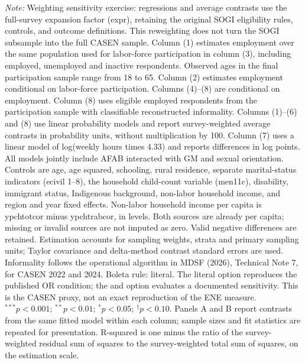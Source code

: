 \begin{table}[htpb!]
\begin{minipage}{\textwidth}
\textit{Note:} Weighting sensitivity exercise: regressions and average contrasts use the full-survey expansion factor (expr), retaining the original SOGI eligibility rules, controls, and outcome definitions. This reweighting does not turn the SOGI subsample into the full CASEN sample. Column (1) estimates employment over the same population used for labor-force participation in column (3), including employed, unemployed and inactive respondents. Observed ages in the final participation sample range from 18 to 65. Column (2) estimates employment conditional on labor-force participation. Columns (4)--(8) are conditional on employment.  Column (8) uses eligible employed respondents from the participation sample with classifiable reconstructed informality. Columns (1)--(6) and (8) use linear probability models and report survey-weighted average contrasts in probability units, without multiplication by 100. Column (7) uses a linear model of log(weekly hours times 4.33) and reports differences in log points. All models jointly include AFAB interacted with GM and sexual orientation. Controls are age, age squared, schooling, rural residence, separate marital-status indicators (ecivil 1--8), the household child-count variable (men11c), disability, immigrant status, Indigenous background, non-labor household income, and region and year fixed effects. Non-labor household income per capita is ypchtotcor minus ypchtrabcor, in levels. Both sources are already per capita; missing or invalid sources are not imputed as zero. Valid negative differences are retained. Estimation accounts for sampling weights, strata and primary sampling units; Taylor covariance and delta-method contrast standard errors are used. Informality follows the operational algorithm in MDSF (2026), Technical Note 7, for CASEN 2022 and 2024. Boleta rule: literal. The literal option reproduces the published OR condition; the and option evaluates a documented sensitivity. This is the CASEN proxy, not an exact reproduction of the ENE measure. $^{***}p<0.001$; $^{**}p<0.01$; $^{*}p<0.05$; $^{\dagger}p<0.10$. Panels A and B report contrasts from the same fitted model within each column; sample sizes and fit statistics are repeated for presentation. R-squared is one minus the ratio of the survey-weighted residual sum of squares to the survey-weighted total sum of squares, on the estimation scale.
\end{minipage}
\end{table}
